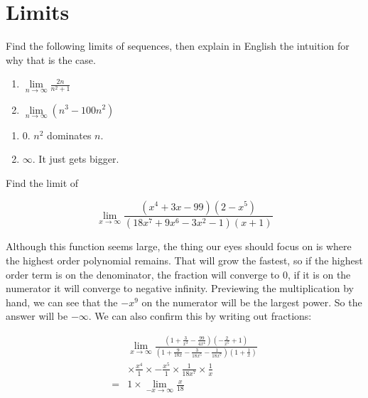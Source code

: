 \documentclass[
]{article}
\begin{document}
\setcounter{section}{1}

\section{Limits}

\begin{exercise}
\protect\hypertarget{exr:limseq2}{}\label{exr:limseq2}

Find the following limits of sequences, then explain in English the intuition for why that is the case.

\begin{enumerate}
\def\labelenumi{\arabic{enumi}.}
\tightlist
\item
  \(\lim\limits_{n\to\infty} \frac{2n}{n^2 + 1}\)
\item
  \(\lim\limits_{n\to\infty} (n^3 - 100n^2)\)
\end{enumerate}

\end{exercise}

\begin{solution}
\hfill
\begin{enumerate}
\item $0$. $n^2$ dominates $n$.
\item $\infty$. It just gets bigger.
\end{enumerate}
\end{solution}

\begin{exercise}
\protect\hypertarget{exr:limfunmax}{}\label{exr:limfunmax}Find the limit of

\[\lim_{x\to\infty} \frac{(x^4 +3x−99)(2−x^5)}{(18x^7 +9x^6 −3x^2 −1)(x+1)}\]
\end{exercise}

\begin{solution}
Although this function seems large, the thing our eyes should focus on is where the highest order polynomial remains. That will grow the fastest, so if the highest order term is on the denominator, the fraction will converge to 0, if it is on the numerator it will converge to negative infinity. Previewing the multiplication by hand, we can see that the \(-x^9\) on the numerator will be the largest power. So the answer will be \(-\infty\). We can also confirm this by writing out fractions:

\begin{align*}  
& \lim_{x\to\infty}\frac{\left(1 + \frac{3}{x^3} - \frac{99}{4x^4}\right)\left(-\frac{2}{x^5} + 1\right)}{\left(1 + \frac{9}{18x} - \frac{3}{18x^5} - \frac{1}{18x^7} \right)\left(1 + \frac{1}{x}\right)} \\
&\times \frac{x^4}{1} \times -\frac{x^5}{1} \times \frac{1}{18x^7}\times \frac{1}{x}\\
=& 1 \times \lim_{-x\to\infty} \frac{x}{18}
\end{align*}
\end{solution}
\end{document}
